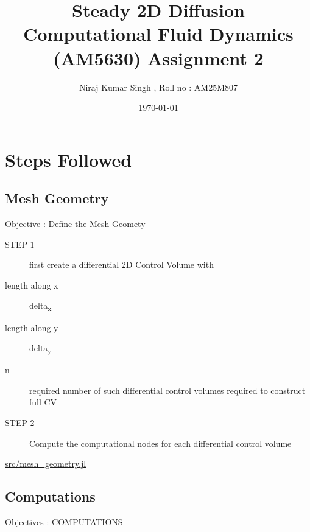 \documentclass[11pt]{article}
\author{Niraj Kumar Singh , Roll no : AM25M807}
\date{\today}
\title{Steady 2D Diffusion\\\medskip
\large Computational Fluid Dynamics (AM5630)  Assignment 2}
\begin{document}
\maketitle
\tableofcontents

\section{Steps Followed}
\label{sec:org10ad743}
\subsection{Mesh  Geometry}
\label{sec:orgc05c062}
Objective : Define  the  Mesh Geomety 

\begin{description}
\item[{STEP 1}] first create a differential 2D Control Volume with
\item[{length along x}] delta\textsubscript{x}
\item[{length along y}] delta\textsubscript{y}
\item[{n}] required number of such differential control volumes
required to construct full CV

\item[{STEP 2}] Compute the computational nodes for each
differential control volume
\end{description}
\url{src/mesh\_geometry.jl}
\subsection{Computations}
\label{sec:org4be3ab9}

Objectives : COMPUTATIONS
\end{document}
